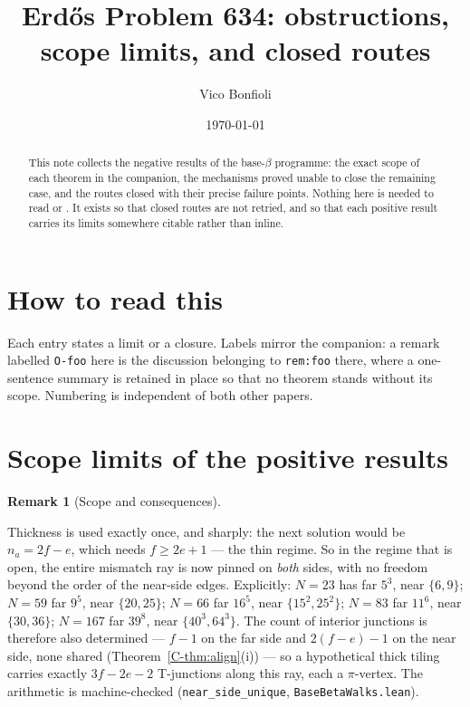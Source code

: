 \documentclass[11pt,reqno]{amsart}
\title{Erd\H{o}s Problem 634: obstructions, scope limits, and closed routes}
\author{Vico Bonfioli}
\date{\today}
\theoremstyle{plain}
\theoremstyle{definition}
\newtheorem{remark}[theorem]{Remark}
\begin{document}
\begin{abstract}
This note collects the negative results of the base-$\beta$ programme: the exact scope of each theorem
in the companion, the mechanisms proved unable to close the remaining case, and the routes closed with
their precise failure points. Nothing here is needed to read \cite{Main} or \cite{Companion}. It exists
so that closed routes are not retried, and so that each positive result carries its limits somewhere
citable rather than inline.
\end{abstract}
\maketitle

\section{How to read this}

Each entry states a limit or a closure. Labels mirror the companion: a remark labelled \texttt{O-foo}
here is the discussion belonging to \texttt{rem:foo} there, where a one-sentence summary is retained in
place so that no theorem stands without its scope. Numbering is independent of both other papers.

\section{Scope limits of the positive results}

\begin{remark}[Scope and consequences]\label{O-ray}

Thickness is used exactly once, and sharply: the next solution would be $n_a=2f-e$, which needs
$f\ge2e+1$ --- the thin regime. So in the regime that is open, the entire mismatch ray is now pinned
on \emph{both} sides, with no freedom beyond the order of the near-side edges. Explicitly:
$N=23$ has far $5^3$, near $\{6,9\}$; $N=59$ far $9^5$, near $\{20,25\}$; $N=66$ far $16^5$, near
$\{15^2,25^2\}$; $N=83$ far $11^6$, near $\{30,36\}$; $N=167$ far $39^8$, near $\{40^3,64^3\}$.
The count of interior junctions is therefore also determined --- $f-1$ on the far side and
$2(f-e)-1$ on the near side, none shared (Theorem~\ref{C-thm:align}(i)) --- so a hypothetical thick
tiling carries exactly $3f-2e-2$ T-junctions along this ray, each a $\pi$-vertex. The arithmetic is
machine-checked (\texttt{near\_side\_unique}, \texttt{BaseBetaWalks.lean}).
\end{remark}
\end{document}
